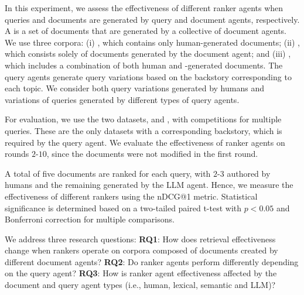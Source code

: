 In this experiment, we assess the effectiveness of different ranker agents when queries and documents are generated by
query and document agents, respectively. 
A \firstmention{\agentcorpus} is a set of documents that are generated by a collective of document agents.
We use three
corpora: (i) \firstmention{\purehumancorpus}, which contains only human-generated documents; (ii) \firstmention{\purellmcorpus}, which consists solely of documents generated by the \llm document agent; and (iii) \firstmention{\mixedcorpus}, which includes a combination of both human and \llm-generated documents. 
The query agents generate query variations based on the backstory corresponding to each topic. We consider both query variations generated by humans and variations of queries generated by different types of query agents.

For evaluation, we use the two \multi datasets, \MultiB and \MultiD,  with competitions for multiple queries.
These are the only datasets with a corresponding backstory, which is required by the query agent.
We evaluate the effectiveness of ranker agents on rounds $2$-$10$, since the \llmagent documents were not modified in the first round. 

A total of five documents are ranked for each query, with $2$-$3$ authored by humans and the remaining generated by the LLM agent. 
Hence, we measure the effectiveness of different rankers using the nDCG@1 metric. Statistical significance is determined based on a two-tailed paired t-test with $p < 0.05$ and Bonferroni correction for multiple comparisons.


We address three research questions:
\textbf{RQ1}: How does retrieval effectiveness change when rankers operate on corpora composed of documents created by different document agents? 
\textbf{RQ2}: Do ranker agents perform differently depending on the query agent?
\textbf{RQ3}: How is ranker agent effectiveness
affected by the document and query agent types (i.e., human, lexical, semantic and LLM)?










